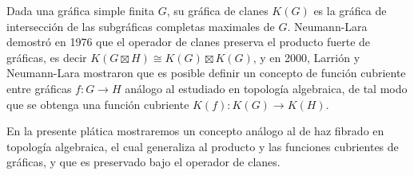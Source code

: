 \documentclass{article}
\begin{document}
Dada una gráfica simple finita $G$, su gráfica de clanes $K(G)$ es la
gráfica de intersección de las subgráficas completas maximales de
$G$. Neumann-Lara demostró en 1976 que el operador de clanes preserva
el producto fuerte de gráficas, es decir
$K(G\boxtimes H)\cong K(G)\boxtimes K(G)$, y en 2000, Larrión y
Neumann-Lara mostraron que es posible definir un concepto de función
cubriente entre gráficas $f\colon G\to H$ análogo al estudiado en
topología algebraica, de tal modo que se obtenga una función cubriente
$K(f)\colon K(G)\to K(H)$.

En la presente plática mostraremos un concepto análogo al de haz
fibrado en topología algebraica, el cual generaliza al producto y las
funciones cubrientes de gráficas, y que es preservado bajo el operador
de clanes.
\end{document}
